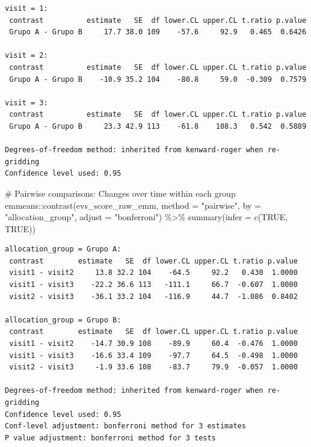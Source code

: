 \documentclass[
  letterpaper,
  DIV=11,
  numbers=noendperiod]{scrartcl}
\newenvironment{Shaded}{\begin{snugshade}}{\end{snugshade}}
\newcommand{\AttributeTok}[1]{\textcolor[rgb]{0.40,0.45,0.13}{#1}}
\newcommand{\CommentTok}[1]{\textcolor[rgb]{0.37,0.37,0.37}{#1}}
\newcommand{\ConstantTok}[1]{\textcolor[rgb]{0.56,0.35,0.01}{#1}}
\newcommand{\FunctionTok}[1]{\textcolor[rgb]{0.28,0.35,0.67}{#1}}
\newcommand{\NormalTok}[1]{\textcolor[rgb]{0.00,0.23,0.31}{#1}}
\newcommand{\SpecialCharTok}[1]{\textcolor[rgb]{0.37,0.37,0.37}{#1}}
\newcommand{\StringTok}[1]{\textcolor[rgb]{0.13,0.47,0.30}{#1}}
\begin{document}
\begin{verbatim}
visit = 1:
 contrast          estimate   SE  df lower.CL upper.CL t.ratio p.value
 Grupo A - Grupo B     17.7 38.0 109    -57.6     92.9   0.465  0.6426

visit = 2:
 contrast          estimate   SE  df lower.CL upper.CL t.ratio p.value
 Grupo A - Grupo B    -10.9 35.2 104    -80.8     59.0  -0.309  0.7579

visit = 3:
 contrast          estimate   SE  df lower.CL upper.CL t.ratio p.value
 Grupo A - Grupo B     23.3 42.9 113    -61.8    108.3   0.542  0.5889

Degrees-of-freedom method: inherited from kenward-roger when re-gridding 
Confidence level used: 0.95 
\end{verbatim}

\begin{Shaded}
\begin{Highlighting}[]
\CommentTok{\# Pairwise comparisons: Changes over time within each group}
\NormalTok{emmeans}\SpecialCharTok{::}\FunctionTok{contrast}\NormalTok{(evs\_score\_raw\_emm, }\AttributeTok{method =} \StringTok{"pairwise"}\NormalTok{, }\AttributeTok{by =} \StringTok{"allocation\_group"}\NormalTok{, }\AttributeTok{adjust =} \StringTok{"bonferroni"}\NormalTok{) }\SpecialCharTok{\%\textgreater{}\%} \FunctionTok{summary}\NormalTok{(}\AttributeTok{infer =} \FunctionTok{c}\NormalTok{(}\ConstantTok{TRUE}\NormalTok{, }\ConstantTok{TRUE}\NormalTok{))}
\end{Highlighting}
\end{Shaded}

\begin{verbatim}
allocation_group = Grupo A:
 contrast        estimate   SE  df lower.CL upper.CL t.ratio p.value
 visit1 - visit2     13.8 32.2 104    -64.5     92.2   0.430  1.0000
 visit1 - visit3    -22.2 36.6 113   -111.1     66.7  -0.607  1.0000
 visit2 - visit3    -36.1 33.2 104   -116.9     44.7  -1.086  0.8402

allocation_group = Grupo B:
 contrast        estimate   SE  df lower.CL upper.CL t.ratio p.value
 visit1 - visit2    -14.7 30.9 108    -89.9     60.4  -0.476  1.0000
 visit1 - visit3    -16.6 33.4 109    -97.7     64.5  -0.498  1.0000
 visit2 - visit3     -1.9 33.6 108    -83.7     79.9  -0.057  1.0000

Degrees-of-freedom method: inherited from kenward-roger when re-gridding 
Confidence level used: 0.95 
Conf-level adjustment: bonferroni method for 3 estimates 
P value adjustment: bonferroni method for 3 tests 
\end{verbatim}
\end{document}
